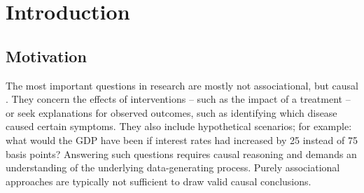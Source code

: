 




\chapter{Introduction}

\section{Motivation}


The most important questions in research are mostly not associational, but causal \citep{pearl2009}. They concern the effects of interventions -- such as the impact of a treatment -- or seek explanations for observed outcomes, such as identifying which disease caused certain symptoms. They also include hypothetical scenarios; for example: what would the GDP have been if interest rates had increased by 25 instead of 75 basis points? Answering such questions requires causal reasoning and demands an understanding of the underlying data-generating process. Purely associational approaches are typically not sufficient to draw valid causal conclusions.




